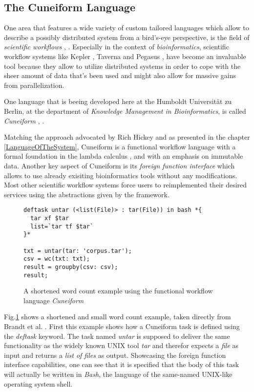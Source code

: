\subsection{The Cuneiform Language}
\label{cuneiform}

One area that features a wide variety of custom tailored languages
which allow to describe a possibly distributed system from a
bird's-eye perspective, is the field of \textit{scientific workflows}
\cite{kepler}, \cite{swf-survey}.
Especially in the context of \textit{bioinformatics}, scientific
workflow systems like Kepler \cite{kepler}, Taverna \cite{taverna}
and Pegasus \cite{pegasus2004}, \cite{pegasus2005} have become an
invaluable tool because they allow to utilize distributed systems
in order to cope with the sheer amount of data that's been used and
might also allow for massive gains from parallelization.

One language that is beeing developed here at the Humboldt
Universität zu Berlin, at the department of \textit{Knowledge Management
in Bioinformatics}, is called \textit{Cuneiform}
\cite{cuneiform}, \cite{saasfee}.

Matching the approach advocated by Rich Hickey and as presented in
the chapter \ref{LanguageOfTheSystem}, Cuneiform is a functional
workflow language with a formal foundation in the lambda calculus
\cite{lambdachurch}, \cite{lambda-calc} and with an emphasis on
immutable data. Another key aspect of Cuneiform is its
\textit{foreign function interface} which allows to use already
exisiting bioinformatics tools without any modifications. Most
other scientific workflow systems force users to reimplemented
their desired services using the abstractions given by the framework.

\begin{figure}[h]
    \begin{lstlisting}
deftask untar (<list(File)> : tar(File)) in bash *{
  tar xf $tar
  list=`tar tf $tar`
}*

txt = untar(tar: 'corpus.tar');
csv = wc(txt: txt);
result = groupby(csv: csv);
result;

    \end{lstlisting}
  \caption{A shortened word count example using the functional workflow
           language \textit{Cuneiform}}
  \label{cf-example}
\end{figure}

Fig.\ref{cf-example} shows a shortened and small word count example,
taken directly from Brandt et al. \cite{cuneiform}. First this
example shows how a Cuneiform task is defined using the \textit{deftask}
keyword. The task named \textit{untar} is supposed to deliver the
same functionality as the widely known UNIX tool \textit{tar} and
therefor expects a \textit{file} as
input and returns a \textit{list of files} as output. Showcasing the
foreign function interface capabilities, one can see that it is
specified that the body of this task will actually be written in
\textit{Bash}, the language of the same-named UNIX-like operating
system shell.

